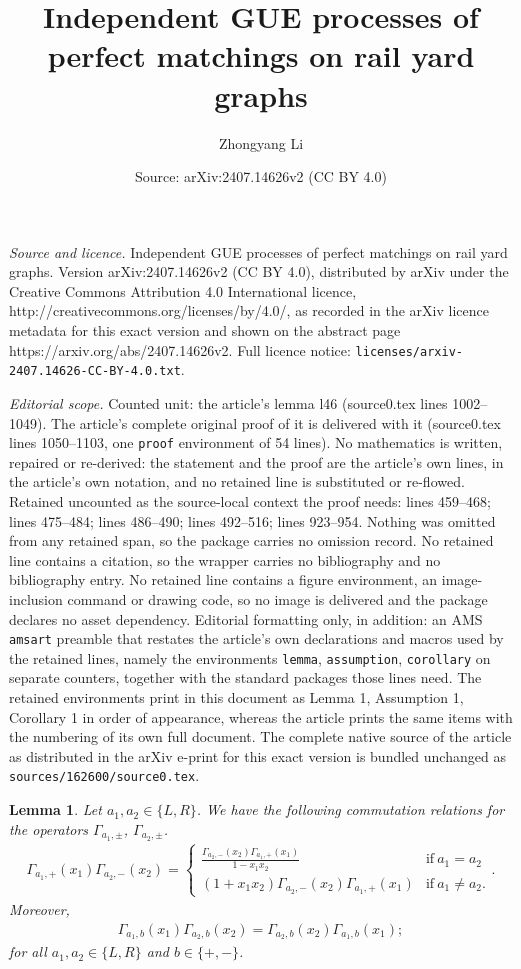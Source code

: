 \documentclass[10pt,a4paper]{amsart}
\title{Independent GUE processes of perfect matchings on rail yard graphs}
\author{Zhongyang Li}
\date{Source: arXiv:2407.14626v2 (CC BY 4.0)}
\newtheorem{lemma}{Lemma}
\begin{document}
\maketitle

\noindent\emph{Source and licence.} Independent GUE processes of perfect matchings on rail yard graphs. Version arXiv:2407.14626v2 (CC BY 4.0), distributed by arXiv under the Creative Commons Attribution 4.0 International licence, http://creativecommons.org/licenses/by/4.0/, as recorded in the arXiv licence metadata for this exact version and shown on the abstract page https://arxiv.org/abs/2407.14626v2. Full licence notice: \texttt{licenses/arxiv-2407.14626-CC-BY-4.0.txt}.\par\smallskip

\noindent\textit{Editorial scope.} Counted unit: the article's lemma l46 (source0.tex lines 1002--1049). The article's complete original proof of it is delivered with it (source0.tex lines 1050--1103, one \texttt{proof} environment of 54 lines). No mathematics is written, repaired or re-derived: the statement and the proof are the article's own lines, in the article's own notation, and no retained line is substituted or re-flowed.  Retained uncounted as the source-local context the proof needs: lines 459--468; lines 475--484; lines 486--490; lines 492--516; lines 923--954.  Nothing was omitted from any retained span, so the package carries no omission record.  No retained line contains a citation, so the wrapper carries no bibliography and no bibliography entry.  No retained line contains a figure environment, an image-inclusion command or drawing code, so no image is delivered and the package declares no asset dependency.  Editorial formatting only, in addition: an AMS \texttt{amsart} preamble that restates the article's own declarations and macros used by the retained lines, namely the environments \texttt{lemma}, \texttt{assumption}, \texttt{corollary} on separate counters, together with the standard packages those lines need.  The retained environments print in this document as Lemma 1, Assumption 1, Corollary 1 in order of appearance, whereas the article prints the same items with the numbering of its own full document.  The complete native source of the article as distributed in the arXiv e-print for this exact version is bundled unchanged as \texttt{sources/162600/source0.tex}.
\begin{lemma}\label{l12}Let $a_1,a_2\in \{L,R\}$. We have the following commutation relations for the operators $\Gamma_{a_1,\pm}$, $\Gamma_{a_2,\pm}$.
\begin{eqnarray*}
\Gamma_{a_1,+}(x_1)\Gamma_{a_2,-}(x_2)=\begin{cases}\frac{\Gamma_{a_2,-}(x_2)\Gamma_{a_1,+}(x_1)}{1-x_1x_2}&\mathrm{if}\ a_1=a_2\\(1+x_1x_2)\Gamma_{a_2,-}(x_2)\Gamma_{a_1,+}(x_1)&\mathrm{if}\ a_1\neq a_2.\end{cases}.
\end{eqnarray*}
Moreover,
\begin{eqnarray*}
\Gamma_{a_1,b}(x_1)\Gamma_{a_2,b}(x_2)=\Gamma_{a_2,b}(x_2)\Gamma_{a_1,b}(x_1);
\end{eqnarray*}
for all $a_1,a_2\in\{L,R\}$ and $b\in\{+,-\}$.
\end{lemma}
\end{document}
